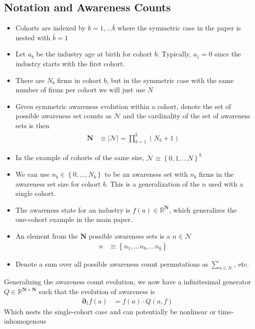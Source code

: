 \documentclass[12pt]{article}
\newcommand{\set}[1]{\ensuremath{\left\{{#1}\right\}}}
\newcommand{\R}{\ensuremath{\mathbb{R}}}
\newcommand{\D}[1][]{\ensuremath{\boldsymbol{\partial}_{#1}}}
\newcommand{\abs}[1]{\ensuremath{\left| {#1}\right|}}
\begin{document}
\subsection{Notation and Awareness Counts}\label{sec:cohort-notation}
\begin{itemize}
	\item Cohorts are indexed by $ b = 1, \ldots \bar{b}$ where the symmetric case in the paper is nested with $\bar{b} = 1$
	\item Let $a_b$ be the industry age at birth for cohort $b$.  Typically, $a_1 = 0$ since the industry starts with the first cohort.
	\item There are $N_b$ firms in cohort $b$, but in the symmetric case with the same number of firms per cohort we will just use $N$
	\item Given symmetric awareness evolution within a cohort, denote the set of possible awareness set counts as $\mathcal{N}$ and the cardinality of the set of awareness sets is then
	\begin{align}
	\mathbf{N} &\equiv \abs{\mathcal{N}} = \prod_{b = 1}^{\bar{b}}(N_b + 1)
	\end{align}
	\item In the example of cohorts of the same size, $\mathcal{N} \equiv \set{0, 1,\ldots N}^{\bar{b}}$
	\item We can use $n_b \in \set{0, \ldots, N_b}$ to be an awareness set with $n_b$ firms in the awareness set size for cohort $b$.  This is a generalization of the $n$ used with a single cohort.	
	\item The awareness state for an industry is $f(a) \in \R^{\mathbf{N}}$, which generalizes the one-cohort example in the main paper.
	\item An element from the $\mathbf{N}$ possible awareness sets is a $n \in \mathcal{N}$
	\begin{align}
	n &\equiv \set{n_1, \ldots n_b, \ldots n_{\bar{b}}}
	\end{align}
	\item Denote a sum over all possible awareness count permutations as $\sum_{n \in \mathcal{N}}$, etc.
\end{itemize}
Generalizing the awareness count evolution, we now have a infinitesimal generator $Q \in \R^{\mathbf{N} \times\mathbf{N}}$ such that the evolution of awareness is
\begin{align}
\D[t]f(a) &= f(a) \cdot Q(a, f)
\end{align}
Which nests the single-cohort case and can potentially be nonlinear or time-inhomogenous
\end{document}
